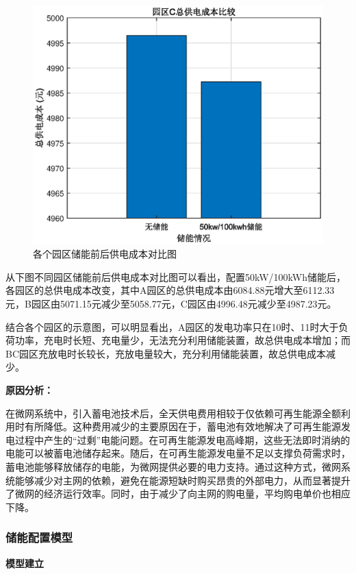 \documentclass{cumcmthesis}
\begin{document}
\begin{figure}[!h]
\begin{minipage}{.5\textwidth}
  \includegraphics[width=.9\linewidth]{figures/1_2_C2比较.eps}  
\end{minipage}  
\caption{各个园区储能前后供电成本对比图}  
\end{figure} 

从下图不同园区储能前后供电成本对比图可以看出，配置50kW/100kWh储能后，各园区的总供电成本改变，其中A园区的总供电成本由6084.88元增大至6112.33元，B园区由5071.15元减少至5058.77元，C园区由4996.48元减少至4987.23元。

结合各个园区的示意图，可以明显看出，A园区的发电功率只在10时、11时大于负荷功率，充电时长短、充电量少，无法充分利用储能装置，故总供电成本增加；而BC园区充放电时长较长，充放电量较大，充分利用储能装置，故总供电成本减少。

\textbf{原因分析：}

在微网系统中，引入蓄电池技术后，全天供电费用相较于仅依赖可再生能源全额利用时有所降低。这种费用减少的主要原因在于，蓄电池有效地解决了可再生能源发电过程中产生的“过剩”电能问题。在可再生能源发电高峰期，这些无法即时消纳的电能可以被蓄电池储存起来。随后，在可再生能源发电量不足以支撑负荷需求时，蓄电池能够释放储存的电能，为微网提供必要的电力支持。通过这种方式，微网系统能够减少对主网的依赖，避免在能源短缺时购买昂贵的外部电力，从而显著提升了微网的经济运行效率。同时，由于减少了向主网的购电量，平均购电单价也相应下降。
  
\subsubsection{储能配置模型}

\textbf{模型建立}  
\end{document}

